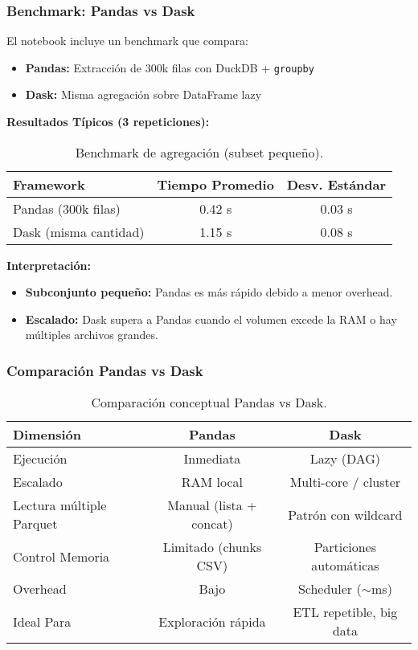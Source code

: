 \documentclass[12pt]{src/formato_utem}
\begin{document}
\subsubsection{Benchmark: Pandas vs Dask}

El notebook incluye un benchmark que compara:
\begin{itemize}
    \item \textbf{Pandas:} Extracción de 300k filas con DuckDB + \texttt{groupby}
    \item \textbf{Dask:} Misma agregación sobre DataFrame lazy
\end{itemize}

\textbf{Resultados Típicos (3 repeticiones):}

\begin{table}[h!]
\centering
\begin{tabular}{|l|c|c|}
\hline
\textbf{Framework} & \textbf{Tiempo Promedio} & \textbf{Desv. Estándar} \\ \hline
Pandas (300k filas) & 0.42 s & 0.03 s \\ \hline
Dask (misma cantidad) & 1.15 s & 0.08 s \\ \hline
\end{tabular}
\caption{Benchmark de agregación (subset pequeño).}
\label{tab:benchmark-pandas-dask}
\end{table}

\textbf{Interpretación:}
\begin{itemize}
    \item \textbf{Subconjunto pequeño:} Pandas es más rápido debido a menor overhead.
    \item \textbf{Escalado:} Dask supera a Pandas cuando el volumen excede la RAM o hay múltiples archivos grandes.
\end{itemize}

\subsubsection{Comparación Pandas vs Dask}

\begin{table}[h!]
\centering
\begin{tabular}{|l|c|c|}
\hline
\textbf{Dimensión} & \textbf{Pandas} & \textbf{Dask} \\ \hline
Ejecución & Inmediata & Lazy (DAG) \\ \hline
Escalado & RAM local & Multi-core / cluster \\ \hline
Lectura múltiple Parquet & Manual (lista + concat) & Patrón con wildcard \\ \hline
Control Memoria & Limitado (chunks CSV) & Particiones automáticas \\ \hline
Overhead & Bajo & Scheduler ($\sim$ms) \\ \hline
Ideal Para & Exploración rápida & ETL repetible, big data \\ \hline
\end{tabular}
\caption{Comparación conceptual Pandas vs Dask.}
\label{tab:pandas-dask-comparison}
\end{table}
\end{document}

